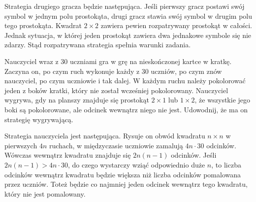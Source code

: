 \begin{center}
\end{center}
Strategia drugiego gracza będzie następująca. Jeśli pierwszy gracz postawi swój symbol w jednym polu prostokąta, drugi gracz stawia swój symbol w drugim polu tego prostokąta. Kwadrat $2 \times 2$ zawiera pewien rozpatrywany prostokąt w całości. Jednak sytuacja, w której jeden prostokąt zawiera dwa jednakowe symbole się nie zdarzy. Stąd rozpatrywana strategia spełnia warunki zadania.


\begin{problem}{5}
	Nauczyciel wraz z 30 uczniami gra w grę na nieskończonej kartce w kratkę. Zaczyna on, po czym ruch wykonuje każdy z 30 uczniów, po czym znów nauczyciel, po czym uczniowie i tak dalej. W każdym ruchu należy pokolorować jeden z boków kratki, który nie został wcześniej pokolorowany. Nauczyciel wygrywa, gdy na planszy znajduje się prostokąt $2 \times 1$ lub $1 \times 2$, że wszystkie jego boki są pokolorowane, ale odcinek wewnątrz niego nie jest. Udowodnij, że ma on strategię wygrywającą.
\end{problem}

\noindent
Strategia nauczyciela jest następująca. Rysuje on obwód kwadratu $n \times n$ w pierwszych $4n$ ruchach, w międzyczasie uczniowie zamalują $4n \cdot 30$ odcinków. Wówczas wewnątrz kwadratu znajduje się $2n(n - 1)$ odcinków. Jeśli $2n(n - 1) > 4n \cdot 30$, do czego wystarczy wziąć odpowiednio duże $n$, to liczba odcinków wewnątrz kwadratu będzie większa niż liczba odcinków pomalowana przez uczniów. Toteż będzie co najmniej jeden odcinek wewnątrz tego kwadratu, który nie jest pomalowany.

